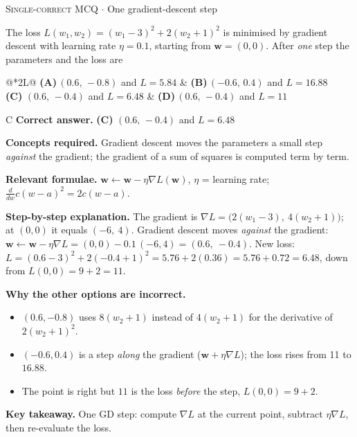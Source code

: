 \documentclass[11pt,a4paper]{article}
\newcommand{\optlabel}[1]{\textbf{(#1)}}
\newcommand{\correctlabel}[1]{\textcolor{okgreen}{\textbf{(#1)}\,\ding{51}}}
\newenvironment{qitem}[1]{\begin{list}{}{\setlength{\leftmargin}{3.3em}\setlength{\labelwidth}{3.1em}%
  \setlength{\labelsep}{0.2em}\setlength{\topsep}{3pt}\setlength{\parsep}{3pt}}\item[\textbf{Q.#1}\hfill]}{\end{list}}
\newcommand{\qsep}{\par\vspace{2pt}{\color{black!15}\hrule}\vspace{4pt}}
\newcommand{\qmeta}[2]{{\footnotesize\color{black!60}\textsc{#1} \;$\cdot$\; #2}\par}
\begin{document}
\begin{qitem}{1}
\qmeta{Single-correct MCQ}{One gradient-descent step}
The loss $L(w_1, w_2) = (w_1 - 3)^2 + 2(w_2 + 1)^2$ is minimised by gradient descent with learning rate
$\eta = 0.1$, starting from $\mathbf w = (0, 0)$. After \emph{one} step the parameters and the loss are
\par\smallskip\noindent\begin{tabularx}{\linewidth}{@{}*{2}{L}@{}}
\optlabel{A}\,$(0.6,\,-0.8)$ and $L = 5.84$ & \optlabel{B}\,$(-0.6,\,0.4)$ and $L = 16.88$ \\[3pt]
\correctlabel{C}\,$(0.6,\,-0.4)$ and $L = 6.48$ & \optlabel{D}\,$(0.6,\,-0.4)$ and $L = 11$
\end{tabularx}
\end{qitem}
\begin{solbox}{C}
\textbf{\color{brand}Correct answer.} \textcolor{okgreen}{\textbf{(C)}} $(0.6,\,-0.4)$ and $L = 6.48$

\textbf{\color{brand}Concepts required.} Gradient descent moves the parameters a small step \emph{against} the gradient; the gradient of a sum of squares is computed term by term.

\textbf{\color{brand}Relevant formulae.} $\mathbf w \leftarrow \mathbf w - \eta\nabla L(\mathbf w)$, $\eta$ = learning rate; $\frac{d}{dw}c(w - a)^2 = 2c(w - a)$.

\textbf{\color{brand}Step-by-step explanation.} The gradient is $\nabla L = \big(2(w_1 - 3),\ 4(w_2 + 1)\big)$; at $(0, 0)$ it equals $(-6,\ 4)$.
Gradient descent moves \emph{against} the gradient: $\mathbf w \leftarrow \mathbf w - \eta\nabla L = (0, 0) - 0.1\,(-6, 4) = (0.6,\ -0.4)$.
New loss: $L = (0.6 - 3)^2 + 2(-0.4 + 1)^2 = 5.76 + 2(0.36) = 5.76 + 0.72 = 6.48$, down from $L(0,0) = 9 + 2 = 11$.

\textbf{\color{brand}Why the other options are incorrect.}
\begin{itemize}[leftmargin=2.4em, itemsep=1pt, topsep=2pt]
\item[\textbf{(A)}] $(0.6, -0.8)$ uses $8(w_2 + 1)$ instead of $4(w_2 + 1)$ for the derivative of $2(w_2 + 1)^2$.
\item[\textbf{(B)}] $(-0.6, 0.4)$ is a step \emph{along} the gradient ($\mathbf w + \eta\nabla L$); the loss rises from 11 to $16.88$.
\item[\textbf{(D)}] The point is right but $11$ is the loss \emph{before} the step, $L(0, 0) = 9 + 2$.
\end{itemize}
\textbf{\color{brand}Key takeaway.} One GD step: compute $\nabla L$ at the current point, subtract $\eta\nabla L$, then re-evaluate the loss.
\end{solbox}
\qsep
\end{document}
